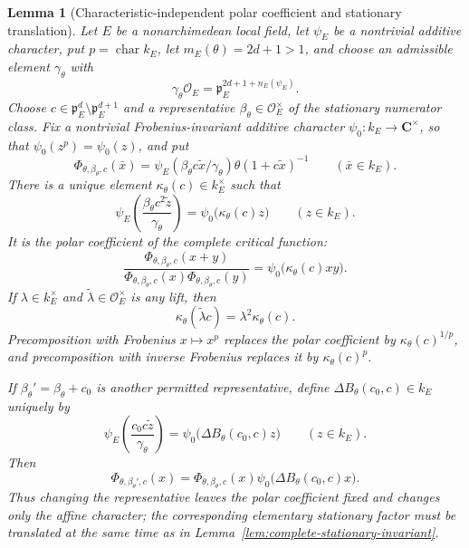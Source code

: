 \documentclass[11pt]{amsart}
\newtheorem{lemma}[theorem]{Lemma}
\theoremstyle{definition}
\theoremstyle{remark}
\newcommand{\C}{\mathbf C}
\newcommand{\cO}{\mathcal O}
\newcommand{\p}{\mathfrak p}
\begin{document}
\begin{lemma}[Characteristic-independent polar coefficient and stationary translation]
\label{lem:critical-polar-coordinate}
Let $E$ be a nonarchimedean local field, let $\psi_E$ be a
nontrivial additive character, put $p=\operatorname{char}k_E$, let
$m_E(\theta)=2d+1>1$, and choose an admissible element
$\gamma_\theta$ with
\[
 \gamma_\theta\cO_E=\p_E^{2d+1+n_E(\psi_E)}.
\]
Choose $c\in\p_E^d\setminus\p_E^{d+1}$ and a representative
$\beta_\theta\in\cO_E^\times$ of the stationary numerator class.  Fix
a nontrivial Frobenius-invariant additive character
$\psi_0:k_E\to\C^\times$, so that
$\psi_0(z^p)=\psi_0(z)$, and put
\[
 \Phi_{\theta,\beta_\theta,c}(\bar x)=
 \psi_E(\beta_\theta c\widetilde x/\gamma_\theta)
 \theta(1+c\widetilde x)^{-1}
 \qquad(\bar x\in k_E).
\]
There is a unique element
$\kappa_\theta(c)\in k_E^\times$ such that
\begin{equation}\label{eq:raw-critical-A}
 \psi_E\!\left(
   \frac{\beta_\theta c^2\widetilde z}{\gamma_\theta}
 \right)
 =\psi_0\bigl(\kappa_\theta(c)z\bigr)
 \qquad(z\in k_E).
\end{equation}
It is the polar coefficient of the complete critical function:
\begin{equation}\label{eq:critical-polar-identity}
 \frac{\Phi_{\theta,\beta_\theta,c}(x+y)}
      {\Phi_{\theta,\beta_\theta,c}(x)
       \Phi_{\theta,\beta_\theta,c}(y)}
 =\psi_0\bigl(\kappa_\theta(c)xy\bigr).
\end{equation}
If $\lambda\in k_E^\times$ and $\widetilde\lambda\in\cO_E^\times$
is any lift, then
\begin{equation}\label{eq:critical-polar-scaling}
 \kappa_\theta(\widetilde\lambda c)
 =\lambda^2\kappa_\theta(c).
\end{equation}
Precomposition with Frobenius $x\mapsto x^p$ replaces the polar
coefficient by $\kappa_\theta(c)^{1/p}$, and precomposition with
inverse Frobenius replaces it by $\kappa_\theta(c)^p$.

If $\beta_\theta' =\beta_\theta+c_0$ is another permitted
representative, define $\Delta B_\theta(c_0,c)\in k_E$ uniquely by
\begin{equation}\label{eq:critical-translation-character}
 \psi_E\!\left(
   \frac{c_0c\widetilde z}{\gamma_\theta}
 \right)
 =\psi_0\bigl(\Delta B_\theta(c_0,c)z\bigr)
 \qquad(z\in k_E).
\end{equation}
Then
\begin{equation}\label{eq:critical-translation-function}
 \Phi_{\theta,\beta_\theta',c}(x)
 =\Phi_{\theta,\beta_\theta,c}(x)
  \psi_0\bigl(\Delta B_\theta(c_0,c)x\bigr).
\end{equation}
Thus changing the representative leaves the polar coefficient fixed
and changes only the affine character; the corresponding elementary
stationary factor must be translated at the same time as in
Lemma~\ref{lem:complete-stationary-invariant}.
\end{lemma}
\end{document}
